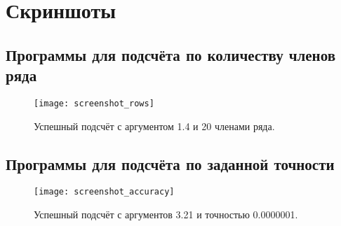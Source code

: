 \section{Скриншоты}

\subsection{Программы для подсчёта по количеству членов ряда}
\begin{figure}[H]
  \centering
  \texttt{[image: screenshot\_rows]}
  \caption{Успешный подсчёт с аргументом 1.4 и 20 членами ряда.}
\end{figure}

\subsection{Программы для подсчёта по заданной точности}
\begin{figure}[H]
  \centering
  \texttt{[image: screenshot\_accuracy]}
  \caption{Успешный подсчёт с аргументов 3.21 и точностью 0.0000001.}
\end{figure}

